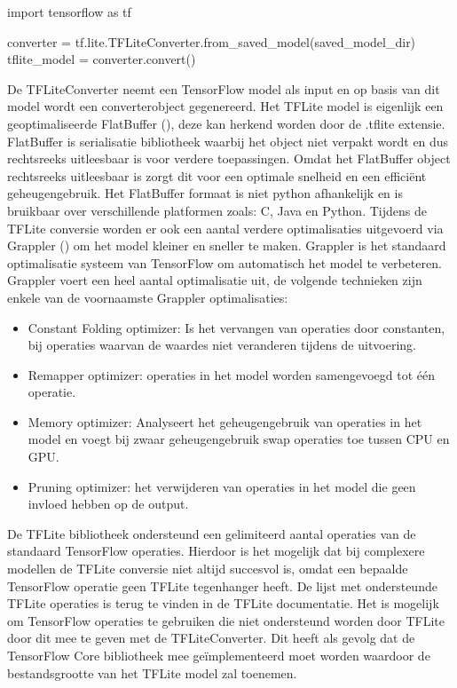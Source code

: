 \begin{python}
import tensorflow as tf

converter = tf.lite.TFLiteConverter.from_saved_model(saved_model_dir)
tflite_model = converter.convert()
\end{python}	

De TFLiteConverter neemt een TensorFlow model als input en op basis van dit model wordt een converterobject gegenereerd.
Het TFLite model is eigenlijk een geoptimaliseerde FlatBuffer (\cite{Google_flatbuffers_2014}), deze kan herkend worden door de .tflite extensie.
FlatBuffer is serialisatie bibliotheek waarbij het object niet verpakt wordt en dus rechtsreeks uitleesbaar is voor verdere toepassingen.
Omdat het FlatBuffer object rechtsreeks uitleesbaar is zorgt dit voor een optimale snelheid en een effici\"ent geheugengebruik.
Het FlatBuffer formaat is niet python afhankelijk en is bruikbaar over verschillende platformen zoals: C, Java en Python.
Tijdens de TFLite conversie worden er ook een aantal verdere optimalisaties uitgevoerd via Grappler (\cite{tensorflow2015-whitepaper}) om het model kleiner en sneller te maken.
Grappler is het standaard optimalisatie systeem van TensorFlow om automatisch het model te verbeteren.
Grappler voert een heel aantal optimalisatie uit, de volgende technieken zijn enkele van de voornaamste Grappler optimalisaties: 

\begin{itemize}
	\item Constant Folding optimizer: Is het vervangen van operaties door constanten, bij operaties waarvan de waardes niet veranderen tijdens de uitvoering.  
	\item Remapper optimizer: operaties  in het model worden samengevoegd tot \'e\'en operatie.
	\item Memory optimizer: Analyseert het geheugengebruik van operaties in het model en voegt bij zwaar geheugengebruik swap operaties toe tussen CPU en GPU.
	\item Pruning optimizer: het verwijderen van operaties in het model die geen invloed hebben op de output.
\end{itemize}

De TFLite bibliotheek ondersteund een gelimiteerd aantal operaties van de standaard TensorFlow operaties.
Hierdoor is het mogelijk dat bij complexere modellen de TFLite conversie niet altijd succesvol is, omdat een bepaalde TensorFlow operatie geen TFLite tegenhanger heeft.
De lijst met ondersteunde TFLite operaties is terug te vinden in de TFLite documentatie.
Het is mogelijk om TensorFlow operaties te gebruiken die niet ondersteund worden door TFLite door dit mee te geven met de TFLiteConverter.
Dit heeft als gevolg dat de TensorFlow Core bibliotheek mee ge\"implementeerd moet worden waardoor de bestandsgrootte van het TFLite model zal toenemen.

